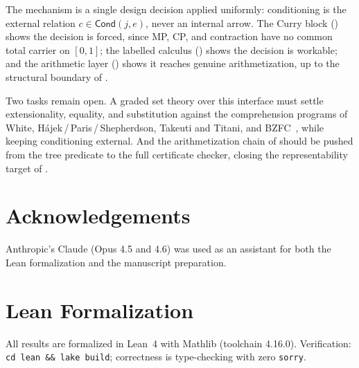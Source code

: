 \documentclass[11pt,a4paper]{article}
\newcommand{\Cond}{\mathsf{Cond}}
\begin{document}
The mechanism is a single design decision applied uniformly:
conditioning is the external relation $c \in \Cond(j,e)$, never an
internal arrow.
The Curry block () shows the decision is forced,
since MP, CP, and contraction have no common total carrier on
$[0,1]$; the labelled calculus () shows the
decision is workable; and the arithmetic layer
() shows it reaches
genuine arithmetization, up to the structural boundary of
.

Two tasks remain open.
A graded set theory over this interface must settle extensionality,
equality, and substitution against the comprehension programs of
White, H\'ajek\,/\,Paris\,/\,Shepherdson, Takeuti and Titani, and
BZFC~\cite{white1979,hajek2000,takeuti1984,khomskii2024}, while
keeping conditioning external.
And the arithmetization chain of  should be pushed
from the tree predicate to the full certificate checker, closing the
representability target of .

\section*{Acknowledgements}

Anthropic's Claude (Opus 4.5 and 4.6) was used as an assistant for both
the Lean formalization and the manuscript preparation.





\appendix

\section{Lean Formalization}
\label{app:lean}

All results are formalized in Lean~4 with Mathlib (toolchain 4.16.0).
Verification: \texttt{cd lean \&\& lake build}; correctness is
type-checking with zero \texttt{sorry}.
\end{document}
